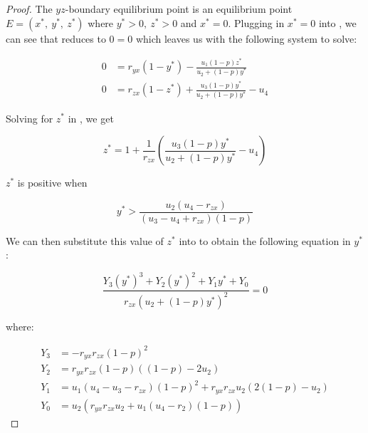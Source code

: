 \begin{proof}
    The $yz$-boundary equilibrium point is an equilibrium point $E=\left(x^*,\ y^*,\ z^*\right)$ where $y^*>0,\ z^*>0$ and $x^*=0$. Plugging in $x^*=0$ into , we can see that  reduces to $0=0$ which leaves us with the following system to solve:

    \begin{subequations}\label{system:yz-boundary}
        \begin{align}
            0 &= r_{yx}\left(1-y^*\right)-\frac{u_1\left(1-p\right)z^*}{u_2+\left(1-p\right)y^*} \label{eq:yz-boundary-y}\\
            0 &= r_{zx}\left(1-z^*\right)+\frac{u_3\left(1-p\right)y^*}{u_2+\left(1-p\right)y^*}-u_4 \label{eq:yz-boundary-z}
        \end{align}
    \end{subequations}

    Solving for $z^*$ in , we get
    
    \begin{equation*}
        z^*=1+\frac{1}{r_{zx}}\left(\frac{u_3\left(1-p\right)y^*}{u_2+\left(1-p\right)y^*}-u_4\right)
    \end{equation*}
    
    $z^*$ is positive when

    \begin{equation*}
        y^* > \frac{u_2\left(u_4-r_{zx}\right)}{\left(u_3-u_4+r_{zx}\right)\left(1-p\right)}
    \end{equation*}

    We can then substitute this value of $z^*$ into  to obtain the following equation in $y^*$:

    \begin{equation}\label{eq:yz-Y-vars}
        \frac{Y_3\left(y^*\right)^3+Y_2\left(y^*\right)^2+Y_1y^*+Y_0}{r_{zx}\left(u_2+\left(1-p\right)y^*\right)^2}=0
    \end{equation}

    where:

    \begin{align*}
        Y_3 &= -r_{yx}r_{zx}\left(1-p\right)^2\\
        Y_2 &= r_{yx}r_{zx}\left(1-p\right)\left(\left(1-p\right)-2u_2\right)\\
        Y_1 &= u_1\left(u_4-u_3-r_{zx}\right)\left(1-p\right)^2+r_{yx}r_{zx}u_2\left(2\left(1-p\right)-u_2\right)\\
        Y_0 &= u_2\left(r_{yx}r_{zx}u_2+u_1\left(u_4-r_2\right)\left(1-p\right)\right)
    \end{align*}


\end{proof}
